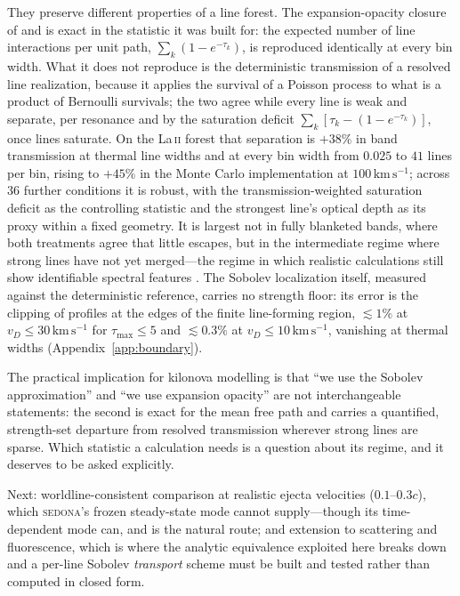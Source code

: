 \documentclass[fleqn,usenatbib]{mnras}
\newcommand{\kms}{\,\mathrm{km\,s^{-1}}}
\begin{document}
They preserve different properties of a line forest. The expansion-opacity
closure of \citet{karp1977} and \citet{eastman1993} is exact in the statistic
it was built for: the expected number of line interactions per unit path,
$\sum_k(1-e^{-\tau_k})$, is reproduced identically at every bin width. What
it does not reproduce is the deterministic transmission of a resolved line
realization, because it applies the survival of a Poisson process to what is
a product of Bernoulli survivals; the two agree while every line is weak and
separate, per resonance and by the saturation deficit
$\sum_k[\tau_k-(1-e^{-\tau_k})]$, once lines saturate. On the La\,\textsc{ii}
forest that separation is $+38\%$ in band transmission at thermal line widths
and at every bin width from $0.025$ to $41$ lines per bin, rising to $+45\%$
in the Monte Carlo implementation at $100\kms$; across 36 further conditions
it is robust, with the transmission-weighted saturation deficit as the
controlling statistic and the strongest line's optical depth as its proxy
within a fixed geometry. It is largest not in fully blanketed bands, where
both treatments agree that little escapes, but in the intermediate regime
where strong lines have not yet merged---the regime in which realistic
calculations still show identifiable spectral features
\citep{domoto2022,tanaka2020}. The Sobolev localization itself, measured
against the deterministic reference, carries no strength floor: its error is
the clipping of profiles at the edges of the finite line-forming region,
$\lesssim1\%$ at $v_D\le30\kms$ for $\tau_{\max}\le5$ and $\lesssim0.3\%$ at
$v_D\le10\kms$, vanishing at thermal widths (Appendix~\ref{app:boundary}).

The practical implication for kilonova modelling is that ``we use the Sobolev
approximation'' and ``we use expansion opacity'' are not interchangeable
statements: the second is exact for the mean free path and carries a
quantified, strength-set departure from resolved transmission wherever strong
lines are sparse. Which statistic a calculation needs is a question about its
regime, and it deserves to be asked explicitly.

Next: worldline-consistent comparison
at realistic ejecta velocities ($0.1$--$0.3c$), which \textsc{sedona}'s
frozen steady-state mode cannot supply---though its time-dependent mode can,
and is the natural route; and extension to scattering
and fluorescence, which is where the analytic equivalence exploited here
breaks down and a per-line Sobolev \emph{transport} scheme must be built and
tested rather than computed in closed form.
\end{document}
